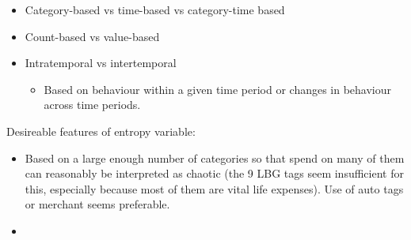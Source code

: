 \begin{itemize}
    \item Category-based vs time-based vs category-time based
        \citep{guidotti2015behavioral, krumme2013predictability}

    \item Count-based vs value-based

    \item Intratemporal vs intertemporal \citep{krumme2013predictability}

        \begin{itemize}
            \item Based on behaviour within a given time period or changes in
                behaviour across time periods.
        \end{itemize}
        
\end{itemize}

Desireable features of entropy variable:

\begin{itemize}
    \item Based on a large enough number of categories so that spend on many of
        them can reasonably be interpreted as chaotic (the 9 LBG tags seem
        insufficient for this, especially because most of them are vital life
        expenses). Use of auto tags or merchant seems preferable.

    \item 
\end{itemize}

